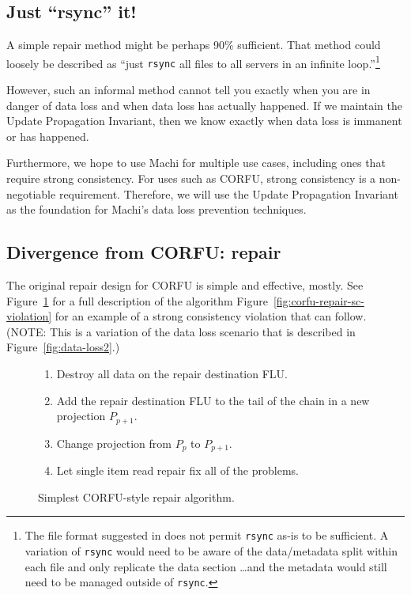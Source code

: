 \documentclass[preprint,10pt]{sigplanconf}
\begin{document}
\subsection{Just ``rsync'' it!}
\label{ssec:just-rsync-it}

A simple repair method might be perhaps 90\% sufficient.
That method could loosely be described as ``just {\tt rsync}
all files to all servers in an infinite loop.''\footnote{The
  file format suggested in
  \cite{machi-design} does not permit {\tt rsync}
  as-is to be sufficient.  A variation of {\tt rsync} would need to be
  aware of the data/metadata split within each file and only replicate
  the data section \ldots and the metadata would still need to be
  managed outside of {\tt rsync}.}

However, such an informal method
cannot tell you exactly when you are in danger of data loss and when
data loss has actually happened.  If we maintain the Update
Propagation Invariant, then we know exactly when data loss is immanent
or has happened.

Furthermore, we hope to use Machi for multiple use cases, including
ones that require strong consistency.
For uses such as CORFU, strong consistency is a non-negotiable
requirement.  Therefore, we will use the Update Propagation Invariant
as the foundation for Machi's data loss prevention techniques.

\subsection{Divergence from CORFU: repair}
\label{sub:repair-divergence}

The original repair design for CORFU is simple and effective,
mostly.  See Figure~\ref{fig:corfu-style-repair} for a full
description of the algorithm
Figure~\ref{fig:corfu-repair-sc-violation} for an example of a strong
consistency violation that can follow.  (NOTE: This is a variation of
the data loss scenario that is described in
Figure~\ref{fig:data-loss2}.)

\begin{figure}
\begin{enumerate}
\item Destroy all data on the repair destination FLU.
\item Add the repair destination FLU to the tail of the chain in a new
  projection $P_{p+1}$.
\item Change projection from $P_p$ to $P_{p+1}$.
\item Let single item read repair fix all of the problems.
\end{enumerate}
\caption{Simplest CORFU-style repair algorithm.}
\label{fig:corfu-style-repair}
\end{figure}
\end{document}
